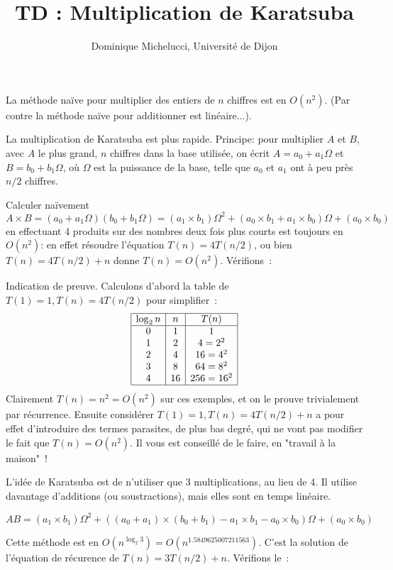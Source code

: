 \documentclass[a4paper]{article}
\begin{document}
\title{TD : Multiplication de Karatsuba} 
\author{Dominique Michelucci, Universit\'e de Dijon}
\maketitle

La m\'ethode na\"ive pour multiplier des entiers de $n$ chiffres est en $O(n^2)$.
(Par contre la m\'ethode na\"ive pour additionner est lin\'eaire...).

La multiplication  de Karatsuba est plus rapide. Principe: pour multiplier $A$ et $B$, avec $A$ le plus grand,
$n$ chiffres dans la base utilis\'ee, on  \'ecrit $A=a_0+ a_1\Omega$ et $B=b_0+b_1\Omega$,
o\`u $\Omega$ est la puissance de la base, telle que $a_0$ et $a_1$ ont \`a peu pr\`es $n/2$ chiffres.

Calculer  na\"ivement
$$A\times B= (a_0+a_1\Omega)(b_0+b_1\Omega)=(a_1\times  b_1) \Omega^2 + (a_0\times  b_1 + a_1\times  b_0)\Omega + (a_0\times  b_0)$$
en effectuant 4 produits sur des nombres deux fois plus courts
est toujours en $O(n^2)$: en effet r\'esoudre l'\'equation $T(n)= 4 T(n/2)$, ou bien $T(n)= 4 T(n/2) + n$
donne $T(n)=O(n^2)$.  V\'erifions~:

Indication de preuve. Calculons d'abord la table de $T(1)=1, T(n)=4 T(n/2)$ pour simplifier~:
$$\begin{array}{|c|c|c|}
\hline
\log_2 n & n & T(n) \\
\hline
0 & 1 & 1 \\
1 & 2 & 4=2^2 \\
2 & 4 & 16=4^2 \\
3 & 8 & 64=8^2 \\
4 & 16 & 256=16^2 \\
\hline
\end{array}
$$
Clairement $T(n)=n^2=O(n^2)$ sur ces exemples, et on le prouve trivialement par r\'ecurrence. 
Ensuite consid\'erer $T(1)=1, T(n)=4 T(n/2)+n$ a pour effet d'introduire des termes parasites, de
plus bas degr\'e, qui ne vont pas modifier le fait que $T(n)=O(n^2)$.
Il vous est conseill\'e de le faire, en "travail \`a la maison"~!


L'id\'ee de Karatsuba est de n'utiliser que 3 multiplications, au lieu de 4.
Il utilise davantage d'additions (ou soustractions), mais elles sont en temps lin\'eaire.

$$AB= (a_1\times b_1) \Omega^2 + ((a_0+a_1)\times(b_0+b_1)- a_1\times b_1 - a_0 \times b_0)\Omega + (a_0\times b_0) $$

Cette m\'ethode est en $O(n^{\log_2 3})=O(n^{1.5849625007211563})$. C'est la solution de l'\'equation de
r\'ecurence de $T(n)=3 T(n/2)+n$. V\'erifions le~:
\end{document}
